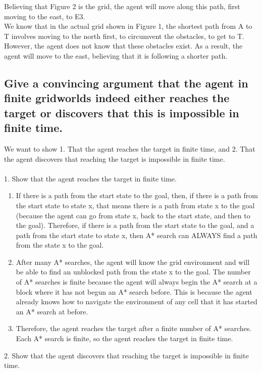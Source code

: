 \documentclass{article}
\begin{document}
Believing that Figure 2 is the grid, the agent will move along this path, first moving to the east, to E3. \\

We know that in the actual grid shown in Figure 1, the shortest path from A to T involves moving to the north first, to circumvent the obstacles, to get to T. However, the agent does not know that these obstacles exist. As a result, the agent will move to the east, believing that it is following a shorter path. \\

\subsection{Give a convincing argument that the agent in finite gridworlds indeed either reaches the target or discovers that this is impossible in finite time. }
We want to show 1. That the agent reaches the target in finite time, and 2. That the agent discovers that reaching the target is impossible in finite time. \\\\
1. Show that the agent reaches the target in finite time.
\begin{enumerate}
	\item If there is a path from the start state to the goal, then, if there is a path from the start state to state x, that means there is a path from state x to the goal (because the agent can go from state x, back to the start state, and then to the goal). Therefore, if there is a path from the start state to the goal, and a path from the start state to state x, then A* search can ALWAYS find a path from the state x to the goal. 
	\item After many A* searches, the agent will know the grid environment and will be able to find an unblocked path from the state x to the goal. The number of A* searches is finite because the agent will always begin the A* search at a block where it has not begun an A* search before. This is because the agent already knows how to navigate the environment of any cell that it has started an A* search at before.
	\item Therefore, the agent reaches the target after a finite number of A* searches. Each A* search is finite, so the agent reaches the target in finite time.
\end{enumerate}
2. Show that the agent discovers that reaching the target is impossible in finite time.
\end{document}
